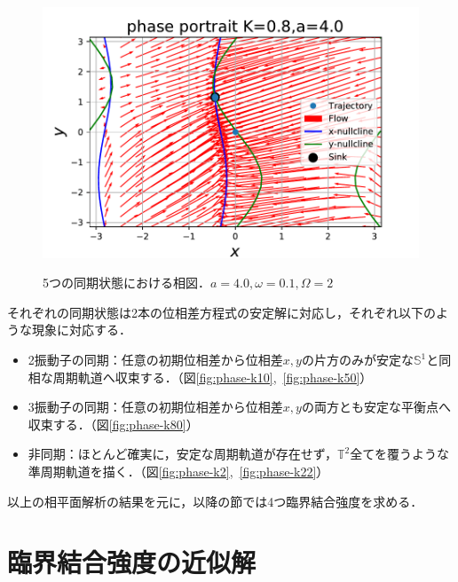 \documentclass[../main]{subfiles}
\begin{document}
\begin{figure}[t]
\begin{minipage}[b]{0.47\linewidth}
      \includegraphics[keepaspectratio, scale=0.42]{images/phase_a4K80.pdf}
      \label{fig:phase-k80}
    \end{minipage}
    \caption{5つの同期状態における相図．$a=4.0,\omega=0.1,\Omega=2$}\label{fig:phase}
\end{figure}

それぞれの同期状態は2本の位相差方程式の安定解に対応し，それぞれ以下のような現象に対応する．
\begin{itemize}
    \item 
    2振動子の同期：任意の初期位相差から位相差$x,y$の片方のみが安定な$\mathbb{S}^1$と同相な周期軌道へ収束する．（図\ref{fig:phase-k10},\ \ref{fig:phase-k50}）
    \item
    3振動子の同期：任意の初期位相差から位相差$x,y$の両方とも安定な平衡点へ収束する．（図\ref{fig:phase-k80}）
    \item
    非同期：ほとんど確実に，安定な周期軌道が存在せず，$\mathbb{T}^2$全てを覆うような準周期軌道を描く．（図\ref{fig:phase-k2},\ \ref{fig:phase-k22}）
\end{itemize}
以上の相平面解析の結果を元に，以降の節では4つ臨界結合強度を求める．
\section{臨界結合強度の近似解}
\end{document}
